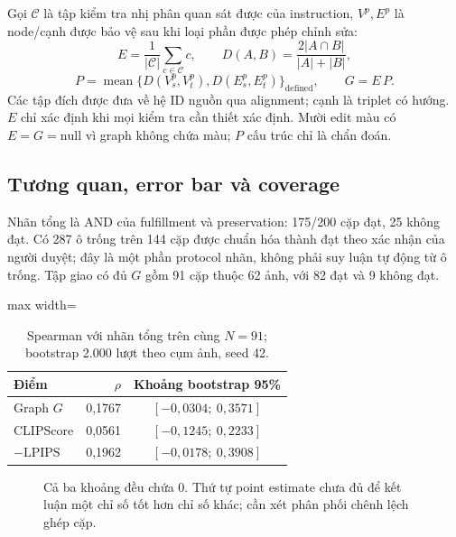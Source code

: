 Gọi $\mathcal C$ là tập kiểm tra nhị phân quan sát được của instruction,
$V^p,E^p$ là node/cạnh được bảo vệ sau khi loại phần được phép chỉnh sửa:
\[
E=\frac{1}{|\mathcal C|}\sum_{c\in\mathcal C}c,\qquad
D(A,B)=\frac{2|A\cap B|}{|A|+|B|},
\]
\[
P=\operatorname{mean}\{D(V_s^p,V_t^p),D(E_s^p,E_t^p)\}_{\mathrm{defined}},
\qquad G=E\,P.
\]
Các tập đích được đưa về hệ ID nguồn qua alignment; cạnh là triplet có hướng.
$E$ chỉ xác định khi mọi kiểm tra cần thiết xác định. Mười edit màu có
$E=G=\mathrm{null}$ vì graph không chứa màu; $P$ cấu trúc chỉ là chẩn đoán.


\subsection{Tương quan, error bar và coverage}
Nhãn tổng là AND của fulfillment và preservation: 175/200 cặp đạt, 25 không đạt.
Có 287 ô trống trên 144 cặp được chuẩn hóa thành đạt theo xác nhận của người duyệt;
đây là một phần protocol nhãn, không phải suy luận tự động từ ô trống.
Tập giao có đủ $G$ gồm 91 cặp thuộc 62 ảnh, với 82 đạt và 9 không đạt.

\begin{table}[!ht]\centering\small
\caption{Spearman với nhãn tổng trên cùng $N=91$; bootstrap 2.000 lượt theo cụm ảnh, seed 42.}\label{tab:corr}
\begin{adjustbox}{max width=\linewidth}\begin{tabular}{@{}lrc@{}}\toprule
Điểm & $\rho$ & Khoảng bootstrap 95\%\\\midrule
Graph $G$ & 0,1767 & $[-0,0304;\ 0,3571]$\\
CLIPScore & 0,0561 & $[-0,1245;\ 0,2233]$\\
$-\mathrm{LPIPS}$ & 0,1962 & $[-0,0178;\ 0,3908]$\\
\bottomrule\end{tabular}\end{adjustbox}\end{table}

\begin{figure}[!ht]\centering
{}
\caption{Cả ba khoảng đều chứa 0. Thứ tự point estimate chưa đủ để kết luận
một chỉ số tốt hơn chỉ số khác; cần xét phân phối chênh lệch ghép cặp.}
\end{figure}

